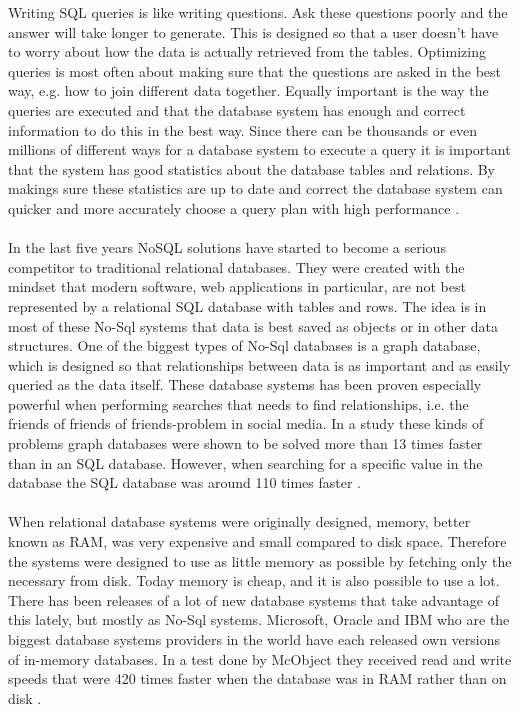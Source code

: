 \documentclass{cslthse-msc}
\begin{document}
Writing SQL queries is like writing questions. Ask these questions poorly and the answer will take longer to generate. This is designed so that a user doesn't have to worry about how the data is actually retrieved from the tables. Optimizing queries is most often about making sure that the questions are asked in the best way, e.g. how to join different data together. Equally important is the way the queries are executed and that the database system has enough and correct information to do this in the best way. Since there can be thousands or even millions of different ways for a database system to execute a query it is important that the system has good statistics about the database tables and relations. By makings sure these statistics are up to date and correct the database system can quicker and more accurately choose a query plan with high performance \cite{Nevarez}.\\\\
In the last five years NoSQL solutions have started to become a serious competitor to traditional relational databases. They were created with the mindset that modern software, web applications in particular, are not best represented by a relational SQL database with tables and rows. The idea is in most of these No-Sql systems that data is best saved as objects or in other data structures. One of the biggest types of No-Sql databases is a graph database, which is designed so that relationships between data is as important and as easily queried as the data itself. These database systems has been proven especially powerful when performing searches that needs to find relationships, i.e. the friends of friends of friends-problem in social media. In a study these kinds of problems graph databases were shown to be solved more than 13 times faster than in an SQL database. However, when searching for a specific value in the database the SQL database was around 110 times faster \cite{vicknair2010comparison}.\\\\
When relational database systems were originally designed, memory, better known as RAM, was very expensive and small compared to disk space. Therefore the systems were designed to use as little memory as possible by fetching only the necessary from disk. Today memory is cheap, and it is also possible to use a lot. There has been releases of a lot of new database systems that take advantage of this lately, but mostly as No-Sql systems. Microsoft, Oracle and IBM who are the biggest database systems providers in the world have each released own versions of in-memory databases. In a test done by McObject they received read and write speeds that were 420 times faster when the database was in RAM rather than on disk \cite{mcobject}.\\\\
\end{document}
